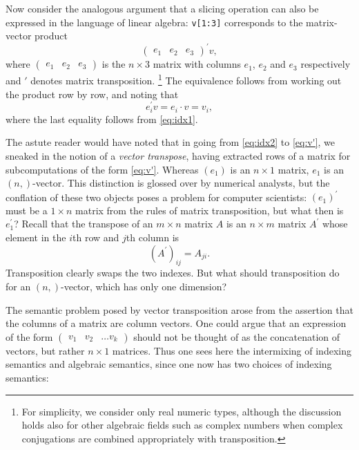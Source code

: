 Now consider the analogous argument that a slicing operation can also be
expressed in the language of linear algebra: \lstinline|v[1:3]| corresponds to
the matrix-vector product
\begin{equation}
	\begin{pmatrix}e_1 & e_2 & e_3\end{pmatrix}^\prime v,\label{eq:idx2}
\end{equation}
where $\begin{pmatrix}e_1 & e_2 & e_3\end{pmatrix}$ is the $n \times 3$
matrix with columns $e_1$, $e_2$ and $e_3$ respectively and $'$ denotes matrix
transposition.%
\footnote{For simplicity, we consider only real numeric types, although the
discussion holds also for other algebraic fields such as complex numbers when
complex conjugations are combined appropriately with transposition.}
The equivalence follows from working out the product row by row,
and noting that
\begin{equation}
	e_i^\prime v = e_i \cdot v = v_i,\label{eq:v'}
\end{equation}
where the last equality follows from \eqref{eq:idx1}.

The astute reader would have noted that in going from \eqref{eq:idx2} to
\eqref{eq:v'}, we sneaked in the notion of a \textit{vector transpose}, having
extracted rows of a matrix for subcomputations of the form \eqref{eq:v'}.
Whereas $(e_1)$ is an $n \times 1$ matrix, $e_1$ is an $(n,)$-vector. This
distinction is glossed over by numerical analysts, but the conflation of these
two objects poses a problem for computer scientists: ${(e_1)}^\prime$ must be
a $1 \times n$ matrix from the rules of matrix transposition, but what then is
$e_1^\prime$? Recall that the transpose of an $m \times n$ matrix $A$ is an
$n \times m$ matrix $A^\prime$ whose element in the $i$th row and $j$th column
is
\begin{equation}
	{\left(A^\prime\right)}_{ij} = A_{ji}.\label{eq:A'}
\end{equation}
Transposition clearly swaps the two indexes. But what should transposition do
for an $(n,)$-vector, which has only one dimension?

The semantic problem posed by vector transposition arose from the assertion
that the columns of a matrix are column vectors. One could argue that an
expression of the form $\begin{pmatrix}v_1 & v_2 & \dots v_k \end{pmatrix}$
should not be thought of as the concatenation of vectors, but rather $n\times1$
matrices. Thus one sees here the intermixing of indexing semantics and
algebraic semantics, since one now has two choices of indexing semantics:

